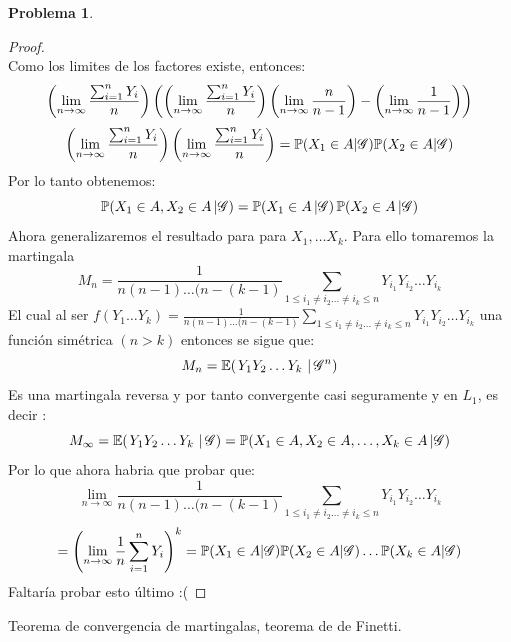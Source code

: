 \documentclass[a5paper,oneside]{amsart}
\theoremstyle{plain}
\theoremstyle{definition}
\newtheorem{problema}{Problema}
\begin{document}
\begin{problema}
\begin{enumerate}
\begin{proof}
$$$$
Como los limites de los factores existe, entonces:
$$
\left( \lim_{n \rightarrow \infty}\frac{\sum_{i=1}^{n}{Y_i}}{n}\right) \left( \left( \lim_{n \rightarrow \infty}\frac{\sum_{i=1}^{n}{Y_i}}{n}\right) \left( \lim_{n \rightarrow \infty}\frac{n}{n-1}\right) -\left( \lim_{n \rightarrow \infty}\frac{1}{n-1}\right) \right) 
$$
$$
\left( \lim_{n \rightarrow \infty}\frac{\sum_{i=1}^{n}{Y_i}}{n}\right) \left( \lim_{n \rightarrow \infty}\frac{\sum_{i=1}^{n}{Y_i}}{n}\right) = \mathbb{P} (X_1 \in A|\mathscr{G}) \mathbb{P} (X_2 \in A|\mathscr{G})
$$
Por lo tanto obtenemos:
$$
\mathbb{P}\! \left( X_1\in A,X_2\in A \, | \mathscr{G} \right)=\mathbb{P}\! \left( X_1\in A \, | \mathscr{G} \right)\mathbb{P}\! \left( X_2\in A \, | \mathscr{G} \right)
$$
Ahora generalizaremos el resultado para para $X_1, \ldots X_k$. Para ello tomaremos la martingala
$$
M_n=\frac{1}{n(n-1)\ldots (n-(k-1)}\sum_{1\leq i_1 \neq i_2 \ldots \neq i_k \leq n}Y_{i_1}Y_{i_2}\ldots Y_{i_k}
$$
El cual al ser $f(Y_1 \ldots Y_k)=\frac{1}{n(n-1)\ldots (n-(k-1)}\sum_{1\leq i_1 \neq i_2 \ldots \neq i_k \leq n}Y_{i_1}Y_{i_2}\ldots Y_{i_k}$ una funci\'on sim\'etrica $(n>k)$ entonces se sigue que:
$$
M_n=\espc{Y_1Y_2\ldots Y_k}{\G^n}
$$
Es una martingala reversa y por tanto convergente casi seguramente y en $L_1$, es decir :
$$
M_\infty=\espc{Y_1Y_2\ldots Y_k}{\G}=\probac{X_1 \in A, X_2 \in A, \ldots,X_k \in A}{\G}
$$
Por lo que ahora habria que  probar que:
$$
\lim_{n \rightarrow \infty}\frac{1}{n(n-1)\ldots (n-(k-1)}\sum_{1\leq i_1 \neq i_2 \ldots \neq i_k \leq n}Y_{i_1}Y_{i_2}\ldots Y_{i_k}
$$
$$
=\left( \lim_{n \rightarrow \infty}\frac{1}{n}\sum_{i=1}^{n}Y_i\right) ^k= \mathbb{P} (X_1 \in A|\mathscr{G}) \mathbb{P} (X_2 \in A|\mathscr{G}) \ldots  \mathbb{P} (X_k \in A|\mathscr{G})
$$
Faltar\'ia probar esto \'ultimo :(
\end{proof}
\end{enumerate}

Teorema de convergencia de martingalas, teorema de de Finetti.
\end{problema}
\end{document}
